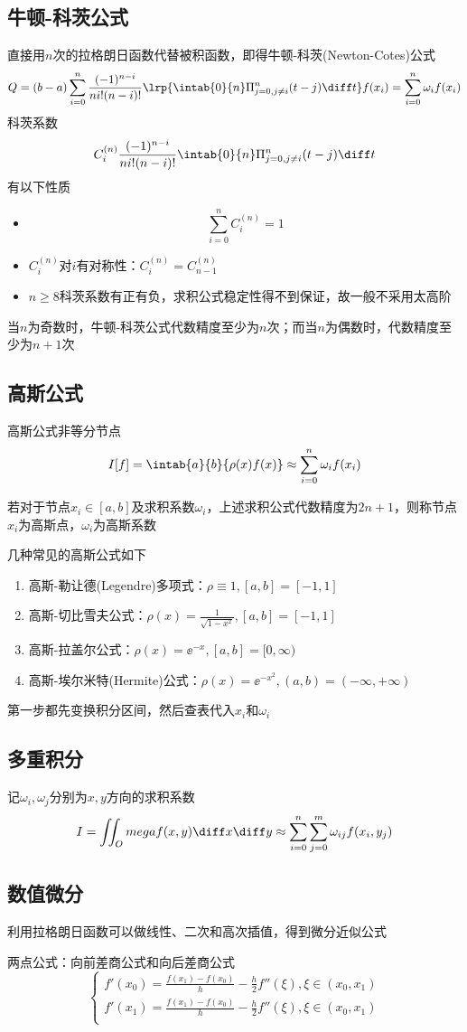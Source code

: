 \subsection{牛顿-科茨公式}
直接用$n$次的拉格朗日函数代替被积函数，即得牛顿-科茨(Newton-Cotes)公式
\[Q=(b-a)\sum_{i=0}^n\frac{(-1)^{n-i}}{ni!(n-i)!}\lrp{\intab{0}{n}\Pi_{j=0,j\ne i}^n(t-j)\diff t}f(x_i)=\sum_{i=0}^n\omega_if(x_i)\]
科茨系数
\[C_i^{(n)}\frac{(-1)^{n-i}}{ni!(n-i)!}\intab{0}{n}\Pi_{j=0,j\ne i}^n(t-j)\diff t\]
有以下性质
\begin{itemize}
    \item \[\sum_{i=0}^nC_{i}^{(n)}=1\]
    \item $C_i^{(n)}$对$i$有对称性：$C_i^{(n)}=C_{n-1}^{(n)}$
    \item $n\geq 8$科茨系数有正有负，求积公式稳定性得不到保证，故一般不采用太高阶
\end{itemize}
\begin{theorem}
    当$n$为奇数时，牛顿-科茨公式代数精度至少为$n$次；而当$n$为偶数时，代数精度至少为$n+1$次
\end{theorem}

\subsection{高斯公式}
高斯公式非等分节点
\[I[f]=\intab{a}{b}{\rho(x)f(x)}\approx\sum_{i=0}^n\omega_if(x_i)\]
\begin{definition}
    若对于节点$x_i\in[a,b]$及求积系数$\omega_i$，上述求积公式代数精度为$2n+1$，则称节点$x_i$为高斯点，$\omega_i$为高斯系数
\end{definition}

几种常见的高斯公式如下
\begin{enumerate}
    \item 高斯-勒让德(Legendre)多项式：$\rho\equiv 1,[a,b]=[-1,1]$
    \item 高斯-切比雪夫公式：$\rho(x)=\frac{1}{\sqrt{1-x^2}},[a,b]=[-1,1]$
    \item 高斯-拉盖尔公式：$\rho(x)=\ee^{-x},[a,b]=[0,\infty)$
    \item 高斯-埃尔米特(Hermite)公式：$\rho(x)=\ee^{-x^2},(a,b)=(-\infty,+\infty)$
\end{enumerate}
第一步都先变换积分区间，然后查表代入$x_i$和$\omega_i$

\subsection{多重积分}
记$\omega_i,\omega_j$分别为$x,y$方向的求积系数
\[I=\iint_Omega f(x,y)\diff x\diff y\approx\sum_{i=0}^n\sum_{j=0}^m\omega_{ij}f(x_i,y_j)\]

\subsection{数值微分}
利用拉格朗日函数可以做线性、二次和高次插值，得到微分近似公式

两点公式：向前差商公式和向后差商公式
\[\begin{cases}
    f'(x_0)=\frac{f(x_1)-f(x_0)}{h}-\frac{h}{2}f''(\xi),\xi\in(x_0,x_1)\\
    f'(x_1)=\frac{f(x_1)-f(x_0)}{h}-\frac{h}{2}f''(\xi),\xi\in(x_0,x_1)\\
\end{cases}\]